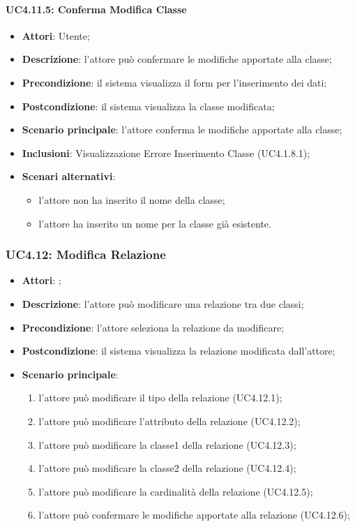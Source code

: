 \paragraph{UC4.11.5: Conferma Modifica Classe}
\label{UC4.11.5}
\begin{itemize}
\item \textbf{Attori}: Utente;
\item \textbf{Descrizione}: l'attore può confermare le modifiche apportate alla classe;
\item \textbf{Precondizione}: il sistema visualizza il form per l'inserimento dei dati;	
\item \textbf{Postcondizione}: il sistema visualizza la classe modificata;	
\item \textbf{Scenario principale}:
l’attore conferma le modifiche apportate alla classe;	
\item \textbf{Inclusioni}:
Visualizzazione Errore Inserimento Classe (UC4.1.8.1);
\item \textbf{Scenari alternativi}:
\begin{itemize}
\item l'attore non ha inserito il nome della classe;
\item l'attore ha inserito un nome per la classe già esistente.
\end{itemize}
\end{itemize}

\subsubsection{UC4.12: Modifica Relazione}
\label{UC4.12}
\begin{itemize}
\item \textbf{Attori}: ;
\item \textbf{Descrizione}: l'attore può modificare una relazione tra due classi;	
\item \textbf{Precondizione}: l'attore seleziona la relazione da modificare;	
\item \textbf{Postcondizione}: il sistema visualizza la relazione modificata dall'attore;	
\item \textbf{Scenario principale}:
\begin{enumerate}
\item l'attore può modificare il tipo della relazione (UC4.12.1);
\item l'attore può modificare l'attributo della relazione (UC4.12.2);
\item l'attore può modificare la classe1 della relazione (UC4.12.3);
\item l'attore può modificare la classe2 della relazione (UC4.12.4);
\item l'attore può modificare la cardinalità della relazione (UC4.12.5); 
\item l'attore può confermare le modifiche apportate alla relazione (UC4.12.6);

\end{enumerate}	
\end{itemize}

